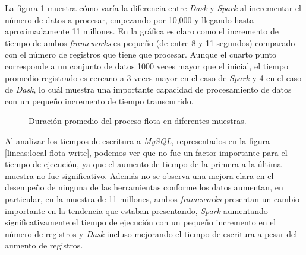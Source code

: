 La figura \ref{lineas:local-flota} muestra cómo varía la diferencia entre \textit{Dask} y \textit{Spark} al incrementar el número de datos a procesar, empezando por 10,000 y llegando hasta aproximadamente 11 millones. En la gráfica es claro como el incremento de tiempo de ambos \textit{frameworks} es pequeño (de entre 8 y 11 segundos) comparado con el número de registros que tiene que procesar. Aunque el cuarto punto corresponde a un conjunto de datos 1000 veces mayor que el inicial, el tiempo promedio registrado es cercano a 3 veces mayor en el caso de \textit{Spark} y 4 en el caso de \textit{Dask}, lo cuál muestra una importante capacidad de procesamiento de datos con un pequeño incremento de tiempo transcurrido. 
\begin{figure}
\centering
{}
\caption{Duración promedio del proceso flota en diferentes muestras.}
\label{lineas:local-flota}
\end{figure}

Al analizar los tiempos de escritura a \textit{MySQL}, representados en la figura \ref{lineas:local-flota-write}, podemos ver que no fue un factor importante para el tiempo de ejecución, ya que el aumento de tiempo de la primera a la última muestra no fue significativo. Además no se observa una mejora clara en el desempeño de ninguna de las herramientas conforme los datos aumentan, en particular, en la muestra de 11 millones, ambos \textit{frameworks} presentan un cambio importante en la tendencia que estaban presentando, \textit{Spark} aumentando significativamente el tiempo de ejecución con un pequeño incremento en el número de registros y \textit{Dask} incluso mejorando el tiempo de escritura a pesar del aumento de registros.

